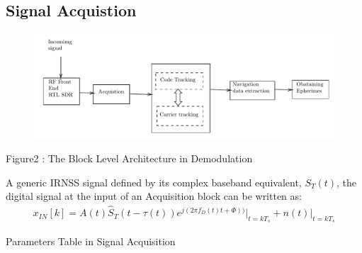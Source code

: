\subsection{Signal Acquistion}
\begin{normalsize}
\begin{figure}[!h]%
\centering%
\includegraphics[scale=0.5]{figs/block2}
\end{figure} 

\end{normalsize}
\begin{center}
Figure2 : The Block Level Architecture in Demodulation
\end{center}
A generic IRNSS signal defined by its complex baseband equivalent, 
$S_T(t)$, the digital signal at the input of an Acquisition block can be written as:
\begin{align}
x_{IN}[k]=A(t)\hat S_T (t-\tau(t))e^{j(2 \pi f_D(t)t+\Phi))}\bigg|_{t=kT_s} +n(t)\bigg|_{t=kT_s}
\end{align}
\begin{table}[h]
\centering
	\caption{\Large{Parameters Table in Signal Acquisition}}
	
\end{table}



